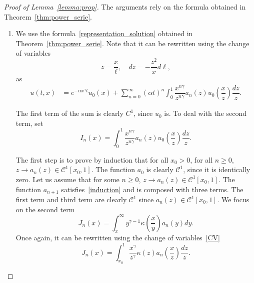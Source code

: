\documentclass[10pt]{amsart}
\theoremstyle{definition}\newtheorem{defi}[theo]{Definition}\newtheorem{rema}[theo]{Remark}\newtheorem{exam}[theo]{Example}\newtheorem{exem}[theo]{Example}\newtheorem{nota}[theo]{Notation}
\newcommand*\dst{\displaystyle}
\renewcommand*\a{\alpha}
\newcommand{\clC}{\mathcal{C}}
\begin{document}
\begin{proof}[Proof of Lemma~\ref{lemma:prop}]
The arguments rely on the formula obtained in Theorem~\ref{thm:power_serie}.
\begin{enumerate}
\item We use the formula~\eqref{representation_solution} obtained in Theorem~\ref{thm:power_serie}. Note that it can be rewritten using the change of variables
\begin{equation}\label{CV}
z=\dfrac{x}{\ell}, \quad dz= -\dfrac{z^2}{x}d\ell,
\end{equation}
as
\begin{equation}\label{name}
\begin{aligned}
u(t,x) &= e^{-\a x^{\gamma}t} u_0(x) + \sum_{n=0}^{\infty} (\a t)^n
\dst\int_0^{1} \dfrac{x^{n\gamma}}{z^{n\gamma}} a_n(z) u_0\left(\dfrac{x}{z}\right) \dfrac{dz}{z}.
\end{aligned}
\end{equation}

The first term of the sum is clearly $C^1$, since $u_0$ is. To deal with the second term, set
\begin{equation*}
I_n(x)= \dst\int_0^{1} \dfrac{x^{n\gamma}}{z^{n\gamma}} a_n(z) u_0\left(\dfrac{x}{z}\right) \dfrac{dz}{z}.
\end{equation*}

The first step is to prove by induction that for all $x_0>0$, for all $n\geq 0$, $z\to a_n(z) \in \clC^1[x_0,1]$. The function $a_0$ is clearly $ \clC^1$, since it is identically zero. Let us assume that for some $n\geq 0$, $z\to a_n(z) \in \clC^1[x_0,1]$. The function $a_{n+1}$ satisfies~\eqref{induction} and is composed with three terms. The first term and third term are clearly $\clC^1$ since $a_n(z) \in \clC^1[x_0,1]$. We focus on the second term
\begin{equation*}
J_n(x)= \dst\int_x^{\infty} y^{\gamma-1} \kappa \left(\dfrac{x}{y} \right)a_n(y)dy.
\end{equation*}
Once again, it can be rewritten using the change of variables~\eqref{CV}
\begin{equation*}
J_n(x)=\dst\int_{x_0}^{1} \dfrac{x^{\gamma}}{z^{\gamma}} \kappa(z) a_n\left(\dfrac{x}{z}\right) \dfrac{dz}{z}.
\end{equation*}


\end{enumerate}
\end{proof}
\end{document}
